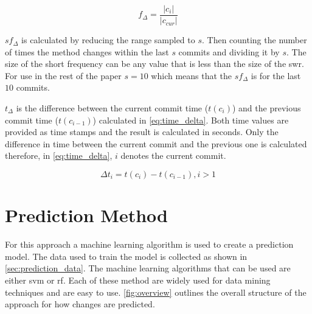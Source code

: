\begin{equation}
\label{eq:freq_change}
f_{\Delta} = \frac{|c_i|}{|c_{cur}|}
\end{equation}

$sf_{\Delta}$ is calculated by reducing the range sampled to $s$. Then counting the number of times the method changes within the last $s$ commits and dividing it by $s$. The size of the short frequency can be any value that is less than the size of the \gls{swr}. For use in the rest of the paper $s = 10$ which means that the $sf_{\Delta}$ is for the last $10$ commits.


$t_\Delta$ is the difference between the current commit time ($t(c_i)$) and the previous commit time ($t(c_{i-1})$) calculated in \autoref{eq:time_delta}. Both time values are provided as time stamps and the result is calculated in seconds. Only the difference in time between the current commit and the previous one is calculated therefore, in \autoref{eq:time_delta}, $i$ denotes the current commit.

\begin{equation}
\label{eq:time_delta}
\Delta t_{i} = t(c_i) - t(c_{i-1}), i > 1
\end{equation}

\section{Prediction Method}
\label{sec:prediction_method}


For this approach a machine learning algorithm is used to create a prediction model. The data used to train the model is collected as shown in \autoref{sec:prediction_data}. The machine learning algorithms that can be used are either \gls{svm} or \gls{rf}. Each of these method are widely used for data mining techniques and are easy to use. \autoref{fig:overview} outlines the overall structure of the approach for how changes are predicted.


